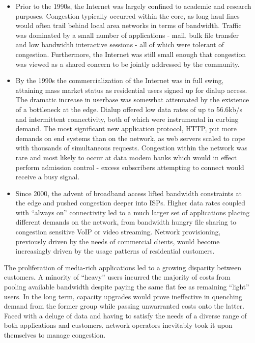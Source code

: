 \begin{itemize}
    \item{Prior to the 1990s, the Internet was largely confined to academic and research purposes. 
        Congestion typically occurred within the core, as long haul lines would often trail behind local area networks in terms of bandwidth. 
        Traffic was dominated by a small number of applications - mail, bulk file transfer and low bandwidth interactive sessions - all of which were tolerant of congestion.
        Furthermore, the Internet was still small enough that congestion was viewed as a shared concern to be jointly addressed by the community.
    }
    \item{By the 1990s the commercialization of the Internet was in full swing, attaining mass market status as residential users signed up for dialup access.
    The dramatic increase in userbase was somewhat attenuated by the existence of a bottleneck at the edge.
    Dialup offered low data rates of up to 56.6kb/s and intermittent connectivity, both of which were instrumental in curbing demand.
    The most significant new application protocol, \ac{HTTP}, put more demands on end systems than on the network, as web servers scaled to cope with thousands of simultaneous requests.
    Congestion within the network was rare and most likely to occur at data modem banks which would in effect perform admission control - excess subscribers attempting to connect would receive a busy signal.
    }
    \item{Since 2000, the advent of broadband access lifted bandwidth constraints at the edge and pushed congestion deeper into \ac{ISP}s.
            Higher data rates coupled with ``always on'' connectivity led to a much larger set of applications placing different demands on the network, from bandwidth hungry file sharing to congestion sensitive \ac{VoIP} or video streaming.
    Network provisioning, previously driven by the needs of commercial clients, would become increasingly driven by the usage patterns of residential customers. 
    }
\end{itemize}

The proliferation of media-rich applications led to a growing disparity between customers.
A minority of ``heavy'' users incurred the majority of costs from pooling available bandwidth despite paying the same flat fee as remaining ``light'' users.
In the long term, capacity upgrades would prove ineffective in quenching demand from the former group while passing unwarranted costs onto the latter.
Faced with a deluge of data and having to satisfy the needs of a diverse range of both applications and customers, network operators inevitably took it upon themselves to manage congestion.

